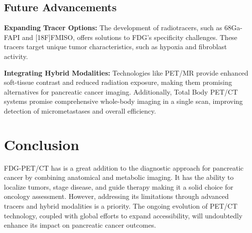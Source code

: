 \documentclass[11pt]{article} %
\begin{document}
\subsection{Future Advancements}

\textbf{Expanding Tracer Options:} The development of radiotracers, such as 68Ga-FAPI and [18F]FMISO, offers solutions to FDG’s specificity challenges. These tracers target unique tumor characteristics, such as hypoxia and fibroblast activity\cite{Deng2021}.

\textbf{Integrating Hybrid Modalities:} Technologies like PET/MR provide enhanced soft-tissue contrast and reduced radiation exposure, making them promising alternatives for pancreatic cancer imaging. Additionally, Total Body PET/CT systems promise comprehensive whole-body imaging in a single scan, improving detection of micrometastases and overall efficiency.


\section{Conclusion}

FDG-PET/CT has is a great addition to the diagnostic approach for pancreatic cancer by combining anatomical and metabolic imaging. It has the ability to localize tumors, stage disease, and guide therapy making it a solid choice for oncology assessment. However, addressing its limitations through advanced tracers and hybrid modalities is a priority. The ongoing evolution of PET/CT technology, coupled with global efforts to expand accessibility, will undoubtedly enhance its impact on pancreatic cancer outcomes.


\end{document}
